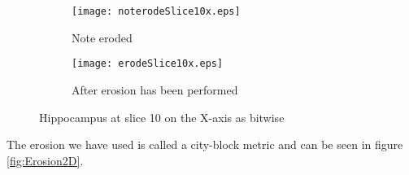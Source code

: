 \begin{figure}[H]
    \begin{subfigure}{.5\textwidth}
      \centering
      \texttt{[image: noterodeSlice10x.eps]}
      \caption{Note eroded}\label{fig:noterodeslice}
    \end{subfigure}
    \begin{subfigure}{.5\textwidth}
      \centering
      \texttt{[image: erodeSlice10x.eps]}
      \caption{After erosion has been performed}\label{fig:erodeslice}
    \end{subfigure}
    \caption{Hippocampus at slice 10 on the X-axis as bitwise}
\end{figure}

The erosion we have used is called a city-block metric and can be seen in figure \ref{fig:Erosion2D}.

